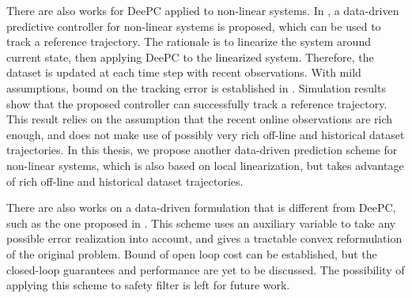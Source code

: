 There are also works for DeePC applied to non-linear systems.
In \cite{berberichLinearTrackingMPCData2022}, a data-driven predictive controller for non-linear systems is proposed, which can be used to track a reference trajectory.
The rationale is to linearize the system around current state, then applying DeePC to the linearized system.
Therefore, the dataset is updated at each time step with recent observations.
With mild assumptions, bound on the tracking error is established in \cite{berberichLinearTrackingMPCData2022}.
Simulation results show that the proposed controller can successfully track a reference trajectory.
This result relies on the assumption that the recent online observations are rich enough, and does not make use of possibly very rich off-line and historical dataset trajectories.
In this thesis, we propose another data-driven prediction scheme for non-linear systems, which is also based on local linearization, but takes advantage of rich off-line and historical dataset trajectories.

There are also works on a data-driven formulation that is different from DeePC, such as the one proposed in \cite{huangRobustDataEnabledPredictive2023}.
This scheme uses an auxiliary variable to take any possible error realization into account, and gives a tractable convex reformulation of the original problem.
Bound of open loop cost can be established, but the closed-loop guarantees and performance are yet to be discussed.
The possibility of applying this scheme to safety filter is left for future work.


